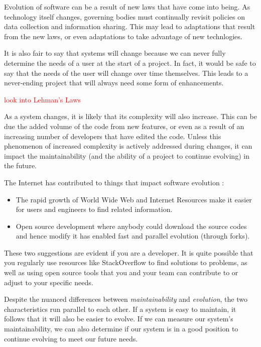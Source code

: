 \documentclass[12pt,conference]{IEEEtran}
\newcommand\todo[1]{\textcolor{red}{#1}}
\begin{document}
Evolution of software can be a result of new laws that have come into being. As technology itself changes, governing bodies must continually revisit policies on data collection and information sharing. This may lead to adaptations that result from the new laws, or even adaptations to take advantage of new technlogies.

It is also fair to say that systems will change because we can never fully determine the needs of a user at the start of a project. In fact, it would be safe to say that the needs of the user will change over time themselves. This leads to a never-ending project that will always need some form of enhancements.

\todo{look into Lehman's Laws \cite{wiki:lehmans-laws}}

As a system changes, it is likely that its complexity will also increase. This can be due the added volume of the code from new features, or even as a result of an increasing number of developers that have edited the code. Unless this phenomenon of increased complexity is actively addressed during changes, it can impact the maintainability (and the ability of a project to continue evolving) in the future.

The Internet has contributed to things that impact software evolution \cite{wiki:software-evolution}:

\begin{itemize}
    \item The rapid growth of World Wide Web and Internet Resources make it easier for users and engineers to find related information.
    \item Open source development where anybody could download the source codes and hence modify it has enabled fast and parallel evolution (through forks).
\end{itemize}

These two suggestions are evident if you are a developer. It is quite possible that you regularly use resources like StackOverflow to find solutions to problems, as well as using open source tools that you and your team can contribute to or adjust to your specific needs.

Despite the nuanced differences between \textit{maintainability} and \textit{evolution}, the two characteristics run parallel to each other. If a system is easy to maintain, it follows that it will also be easier to evolve. If we can measure our system's maintainability, we can also determine if our system is in a good position to continue evolving to meet our future needs.
\end{document}
